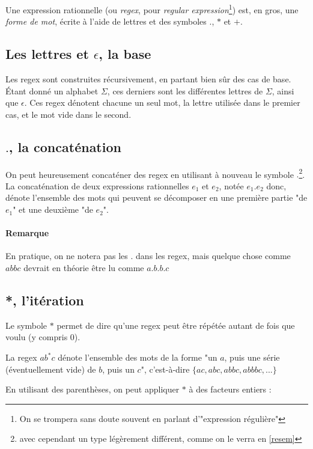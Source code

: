 Une expression rationnelle (ou \textit{regex}, pour \textit{regular expression}\footnote{On se trompera sans doute souvent en parlant d'"expression régulière"}) est, en gros, une \textit{forme de mot}, écrite à l'aide de lettres et des symboles $.$, $*$ et $+$.

\subsection{Les lettres et $\epsilon$, la base}

Les regex sont construites récursivement, en partant bien sûr des cas de base. Étant donné un alphabet $\Sigma$, ces derniers sont les différentes lettres de $\Sigma$, ainsi que $\epsilon$. Ces regex dénotent chacune un seul mot, la lettre utilisée dans le premier cas, et le mot vide dans le second.

\subsection{$.$, la concaténation}

On peut heureusement concaténer des regex en utilisant à nouveau le symbole $.$\footnote{avec cependant un type légèrement différent, comme on le verra en \ref{resem}}. La concaténation de deux expressions rationnelles $e_1$ et $e_2$, notée $e_1.e_2$ donc, dénote l'ensemble des mots qui peuvent se décomposer en une première partie "de $e_1$" et une deuxième "de $e_2$".

\paragraph{Remarque} En pratique, on ne notera pas les $.$ dans les regex, mais quelque chose comme $abbc$ devrait en théorie être lu comme $a.b.b.c$

\subsection{*, l'itération}

Le symbole $*$ permet de dire qu'une regex peut être répétée autant de fois que voulu (y compris 0). 

\begin{example}
La regex $ab^*c$ dénote l'ensemble des mots de la forme "un $a$, puis une série (éventuellement vide) de $b$, puis un $c$", c'est-à-dire $\{ac, abc, abbc, abbbc, ...\}$
\end{example}

En utilisant des parenthèses, on peut appliquer $*$ à des facteurs entiers :

